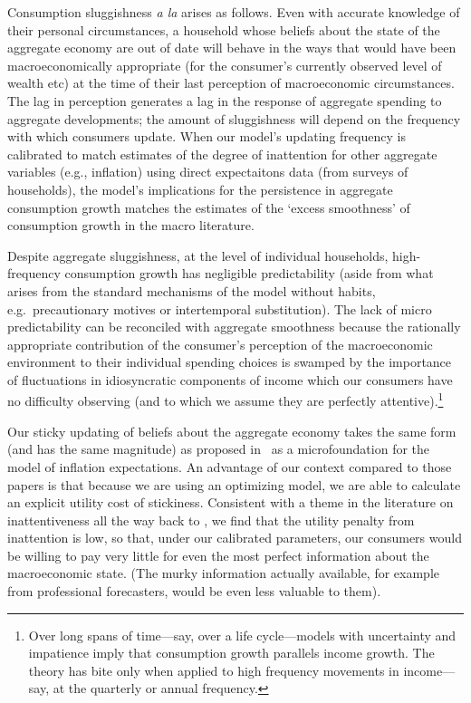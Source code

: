\documentclass[titlepage]{\econtex}\newcommand{\texname}{cAndCwithStickyE}
\begin{document}
Consumption sluggishness {\it a la} \cite{cdSmooth} arises as follows.  Even with accurate knowledge of their personal circumstances, a household whose beliefs about the state of the aggregate economy are out of date will behave in the ways that would have been macroeconomically appropriate (for the consumer's currently observed level of wealth etc) at the time of their last perception of macroeconomic circumstances.  The lag in perception generates a lag in the response of aggregate spending to aggregate developments; the amount of sluggishness will depend on the frequency with which consumers update.  When our model's updating frequency is calibrated to match estimates of the degree of inattention for other aggregate variables (e.g., inflation) using direct expectaitons data (from surveys of households), the model's implications for the persistence in aggregate consumption growth matches the estimates of the `excess smoothness' of consumption growth in the macro literature.

Despite aggregate sluggishness, at the level of individual households, high-frequency consumption growth has negligible predictability (aside from what arises from the standard mechanisms of the model without habits, e.g.\ precautionary motives or intertemporal substitution).  The lack of micro predictability can be reconciled with aggregate smoothness because the rationally appropriate contribution of the consumer's perception of the macroeconomic environment to their individual spending choices is swamped by the importance of fluctuations in idiosyncratic components of income which our consumers have no difficulty observing (and to which we assume they are perfectly attentive).\footnote{Over long spans of time---say, over a life cycle---models with uncertainty and impatience imply that consumption growth parallels income growth.  The theory has bite only when applied to high frequency movements in income---say, at the quarterly or annual frequency.}

Our sticky updating of beliefs about the aggregate economy takes the same form (and has the same magnitude) as proposed in~\cite{carroll:epidemicinflQJE} as a microfoundation for the~\cite{mrSlumps} model of inflation expectations.  An advantage of our context compared to those papers is that because we are using an optimizing model, we are able to calculate an explicit utility cost of stickiness.  Consistent with a theme in the literature on inattentiveness all the way back to \cite{ayNearRational}, we find that the utility penalty from inattention is low, so that, under our calibrated parameters, our consumers would be willing to pay very little for even the most perfect information about the macroeconomic state.  (The murky information actually available, for example from professional forecasters, would be even less valuable to them). 
\end{document}
